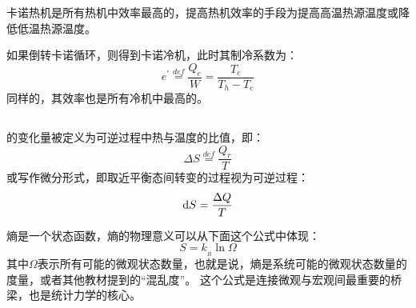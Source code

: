             卡诺热机是所有热机中效率最高的，提高热机效率的手段为提高高温热源温度或降低低温热源温度。
            
            如果倒转卡诺循环，则得到卡诺冷机，此时其制冷系数为：
            \begin{equation}
                e^{\prime} \overset{def}{=} \frac{Q_c}{W} = \frac{T_c}{T_h - T_c}
                \nonumber
            \end{equation}
            同样的，其效率也是所有冷机中最高的。
        \subsection[熵]{}
            的变化量被定义为可逆过程中热与温度的比值，即：
            \begin{equation}
                \Delta S \overset{def}{=} \frac{Q_r}{T} 
                \nonumber
            \end{equation}
            或写作微分形式，即取近平衡态间转变的过程视为可逆过程：
            \begin{equation}
                \mathrm{d}{S} = \frac{\Delta{Q}}{T} 
                \nonumber
            \end{equation}
            
            熵是一个状态函数，熵的物理意义可以从下面这个公式中体现：
            \begin{equation}
                S = k_{_B}\ln\Omega
                \nonumber
            \end{equation}
            其中$\Omega$表示所有可能的微观状态数量，也就是说，熵是系统可能的微观状态数量的度量，或者其他教材提到的“混乱度”。
            这个公式是连接微观与宏观间最重要的桥梁，也是统计力学的核心。

